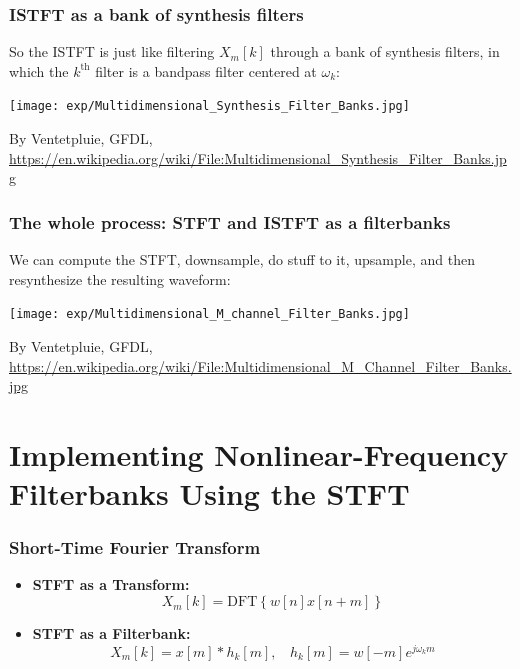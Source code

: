 \documentclass{beamer}
\begin{document}
\begin{frame}
  \frametitle{ISTFT as a bank of synthesis filters}

  So the ISTFT is just like filtering $X_m[k]$ through a bank of synthesis
  filters, in which the $k^{\textrm{th}}$ filter is a bandpass filter
  centered at $\omega_k$:
  \centerline{\texttt{[image: exp/Multidimensional\_Synthesis\_Filter\_Banks.jpg]}}
  \begin{tiny}
    By Ventetpluie, GFDL,
    \url{https://en.wikipedia.org/wiki/File:Multidimensional_Synthesis_Filter_Banks.jpg}
  \end{tiny}
\end{frame}
  
\begin{frame}
  \frametitle{The whole process: STFT and ISTFT as a filterbanks}

  We can compute the STFT, downsample, do stuff to it, upsample, and then resynthesize the
  resulting waveform:
  \centerline{\texttt{[image: exp/Multidimensional\_M\_channel\_Filter\_Banks.jpg]}}
  \begin{tiny}
    By Ventetpluie, GFDL,
    \url{https://en.wikipedia.org/wiki/File:Multidimensional_M_Channel_Filter_Banks.jpg}
  \end{tiny}
\end{frame}
  
\section[Nonlinear Frequency]{Implementing Nonlinear-Frequency Filterbanks Using the STFT}
\setcounter{subsection}{1}

\begin{frame}
  \frametitle{Short-Time Fourier Transform}
  \begin{itemize}
  \item {\bf STFT as a Transform:}
    \[
    X_m[k] = \mbox{DFT}\left\{w[n]x[n+m]\right\}
    \]
  \item {\bf STFT as a Filterbank:}
    \[
    X_m[k] = x[m] \ast h_k[m],~~~~h_k[m] = w[-m]e^{j\omega_k m}
    \]
  \end{itemize}
\end{frame}
\end{document}
